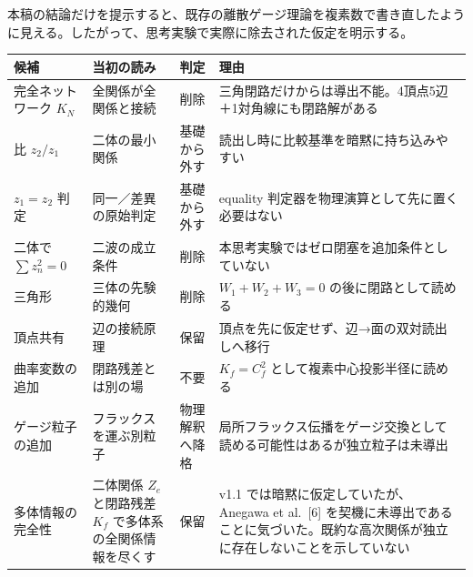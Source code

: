 \documentclass[
  a4paper,
]{ltjsarticle}
\newcounter{none} %
\begin{document}
本稿の結論だけを提示すると、既存の離散ゲージ理論を複素数で書き直したように見える。したがって、思考実験で実際に除去された仮定を明示する。

{\def\LTcaptype{none} %
\begin{longtable}[]{@{}
  >{\raggedright\arraybackslash}p{}
  >{\raggedright\arraybackslash}p{}
  >{\raggedright\arraybackslash}p{}
  >{\raggedright\arraybackslash}p{}@{}}
\toprule\noalign{}
\begin{minipage}[b]{\linewidth}\raggedright
候補
\end{minipage} & \begin{minipage}[b]{\linewidth}\raggedright
当初の読み
\end{minipage} & \begin{minipage}[b]{\linewidth}\raggedright
判定
\end{minipage} & \begin{minipage}[b]{\linewidth}\raggedright
理由
\end{minipage} \\
\midrule\noalign{}
\endhead
\bottomrule\noalign{}
\endlastfoot
完全ネットワーク \(K_N\) & 全関係が全関係と接続 & 削除 &
三角閉路だけからは導出不能。4頂点5辺＋1対角線にも閉路解がある \\
比 \(z_2/z_1\) & 二体の最小関係 & 基礎から外す &
読出し時に比較基準を暗黙に持ち込みやすい \\
\(z_1=z_2\) 判定 & 同一／差異の原始判定 & 基礎から外す & equality
判定器を物理演算として先に置く必要はない \\
二体で \(\sum z_n^2=0\) & 二波の成立条件 & 削除 &
本思考実験ではゼロ閉塞を追加条件としていない \\
三角形 & 三体の先験的幾何 & 削除 & \(W_1+W_2+W_3=0\)
の後に閉路として読める \\
頂点共有 & 辺の接続原理 & 保留 &
頂点を先に仮定せず、辺→面の双対読出しへ移行 \\
曲率変数の追加 & 閉路残差とは別の場 & 不要 & \(K_f=C_f^2\)
として複素中心投影半径に読める \\
ゲージ粒子の追加 & フラックスを運ぶ別粒子 & 物理解釈へ降格 &
局所フラックス伝播をゲージ交換として読める可能性はあるが独立粒子は未導出 \\
多体情報の完全性 & 二体関係 \(Z_e\) と閉路残差 \(K_f\)
で多体系の全関係情報を尽くす & 保留 & v1.1
では暗黙に仮定していたが、Anegawa et al.~{[}6{]}
を契機に未導出であることに気づいた。既約な高次関係が独立に存在しないことを示していない \\
\end{longtable}
}
\end{document}
